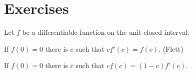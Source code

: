 \documentclass{../../large}
\begin{document}
\section*{Exercises}
\begin{prb}
Let $f$ be a differentiable function on the unit closed interval.
\begin{parts}
\item If $f(0)=0$ there is $c$ such that $cf'(c)=f(c)$. (Flett)
\item If $f(0)=0$ there is $c$ such that $cf(c)=(1-c)f'(c)$.
\end{parts}
\end{prb}
\begin{prb}
\end{prb}
\begin{prb}
\end{prb}
\begin{prb}
\end{prb}
\end{document}
